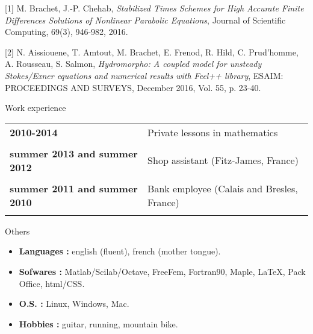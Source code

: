 \documentclass[10pt,a4paper]{report}
\begin{document}
\vspace{0.6cm}

[1] {\sc M. Brachet, J.-P. Chehab}, {\sl Stabilized Times Schemes for High Accurate Finite Differences Solutions of Nonlinear Parabolic Equations}, Journal of Scientific Computing, 69(3), 946-982, 2016.

\vspace{0.6cm}

[2] {\sc  N. Aissiouene, T. Amtout, M. Brachet, E. Frenod, R. Hild, C. Prud'homme, A. Rousseau, S. Salmon}, {\sl  Hydromorpho: A coupled model for unsteady Stokes/Exner equations and numerical results with Feel++ library}, ESAIM: PROCEEDINGS AND SURVEYS, December 2016, Vol. 55, p. 23-40.






\vspace{1cm}
\noindent
{\selectfont
\begin{Large}
Work experience
\end{Large}
\hrulefill
}

\vspace{0.6cm}
\noindent
\begin{center}
\begin{tabular}{p{5cm} p{10cm}}
\textbf{2010-2014} & Private lessons in mathematics\\

& \\

\textbf{summer 2013 and summer 2012} & Shop assistant (Fitz-James, France) \\

& \\

\textbf{summer 2011 and summer 2010} & Bank employee (Calais and Bresles, France) \\

& \\

\end{tabular}
\end{center}


\vspace{0.6cm}
\noindent
{\selectfont
\begin{Large}
Others
\end{Large}
\hrulefill
}

\vspace{1cm}
\noindent
\begin{itemize}
\item \textbf{Languages :} english (fluent), french (mother tongue).
\item \textbf{Sofwares :} Matlab/Scilab/Octave, FreeFem, Fortran90, Maple, \LaTeX, Pack Office, html/CSS.
\item \textbf{O.S. :} Linux, Windows, Mac.
\item \textbf{Hobbies :} guitar, running, mountain bike.

\end{itemize}
\end{document}
